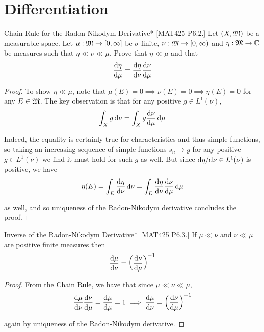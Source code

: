 \newpage
\section{Differentiation}

\begin{problem}{Chain Rule for the Radon-Nikodym Derivative}*
    [MAT425 P6.2.] Let \((X, \mathfrak{M})\) be a measurable space. Let \(\mu : \mathfrak{M} \to [0, \infty]\) be \(\sigma\)-finite, \(\nu : \mathfrak{M} \to [0, \infty)\) and \(\eta : \mathfrak{M} \to \mathbb{C}\) be measures such that \(\eta \ll \nu \ll \mu\). Prove that \(\eta \ll \mu\) and that 
    \[
        \frac{\mathrm{d}\eta}{\mathrm{d}\mu} = \frac{\mathrm{d}\eta}{\mathrm{d}\nu} \frac{\mathrm{d}\nu}{\mathrm{d}\mu}
    \]
\end{problem}

\begin{proof}
    To show \(\eta \ll \mu\), note that \(\mu(E) = 0 \implies \nu(E) = 0 \implies \eta(E) = 0\) for any \(E \in \mathfrak{M}\). The key observation is that for any positive \(g \in L^1(\nu)\), 
    \[
        \int_X g \, \mathrm{d}\nu = \int_X g \frac{\mathrm{d}\nu}{\mathrm{d}\mu} \, \mathrm{d}\mu
    \]

    Indeed, the equality is certainly true for characteristics and thus simple functions, so taking an increasing sequence of simple functions \(s_n \to g\) for any positive \(g \in L^1(\nu)\) we find it must hold for such \(g\) as well. But since \(\mathrm{d}\eta / \mathrm{d}\nu \in L^1(\nu)\) is positive, we have 
    \[
        \eta(E) = \int_E \frac{\mathrm{d}\eta}{\mathrm{d}\nu} \, \mathrm{d}\nu = \int_E \frac{\mathrm{d}\eta}{\mathrm{d}\nu} \frac{\mathrm{d}\nu}{\mathrm{d}\mu} \, \mathrm{d}\mu
    \]

    as well, and so uniqueness of the Radon-Nikodym derivative concludes the proof. 
\end{proof}

\begin{problem}{Inverse of the Radon-Nikodym Derivative}*
    [MAT425 P6.3.] If \(\mu \ll \nu\) and \(\nu \ll \mu\) are positive finite measures then 
    \[
        \frac{\mathrm{d}\mu}{\mathrm{d}\nu} = \left( \frac{\mathrm{d}\nu}{\mathrm{d}\mu} \right)^{-1}
    \]
\end{problem}

\begin{proof}
    From the Chain Rule, we have that since \(\mu \ll \nu \ll \mu\), 
    \[
        \frac{\mathrm{d}\mu}{\mathrm{d}\nu}\frac{\mathrm{d}\nu}{\mathrm{d}\mu} = \frac{\mathrm{d}\mu}{\mathrm{d}\mu} = 1
        \implies 
        \frac{\mathrm{d}\mu}{\mathrm{d}\nu} = \left( \frac{\mathrm{d}\nu}{\mathrm{d}\mu} \right)^{-1} 
    \]

    again by uniqueness of the Radon-Nikodym derivative. 
\end{proof}

